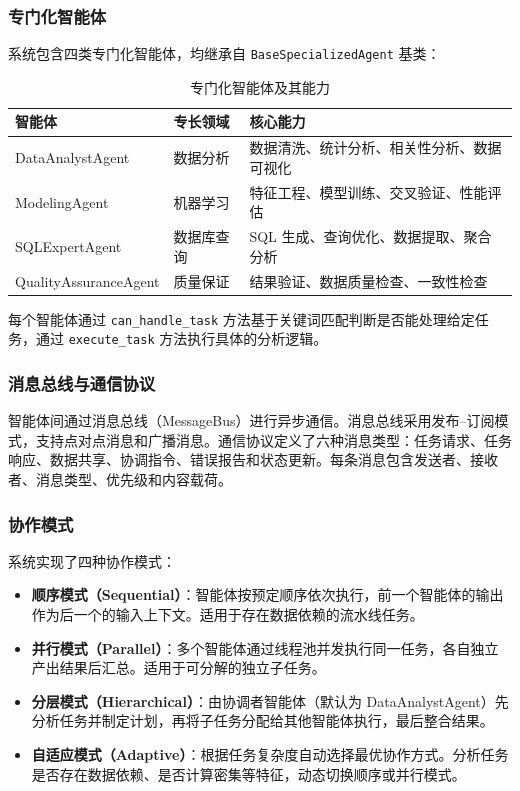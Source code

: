 \subsubsection{专门化智能体}

系统包含四类专门化智能体，均继承自 \texttt{BaseSpecializedAgent} 基类：

\begin{table}[htbp]
    \centering
    \caption{专门化智能体及其能力}
    \label{tab:agents}
    \begin{tabular}{llp{7cm}}
        \toprule
        智能体 & 专长领域 & 核心能力 \\
        \midrule
        DataAnalystAgent & 数据分析 & 数据清洗、统计分析、相关性分析、数据可视化 \\
        ModelingAgent & 机器学习 & 特征工程、模型训练、交叉验证、性能评估 \\
        SQLExpertAgent & 数据库查询 & SQL 生成、查询优化、数据提取、聚合分析 \\
        QualityAssuranceAgent & 质量保证 & 结果验证、数据质量检查、一致性检查 \\
        \bottomrule
    \end{tabular}
\end{table}

每个智能体通过 \texttt{can\_handle\_task} 方法基于关键词匹配判断是否能处理给定任务，通过 \texttt{execute\_task} 方法执行具体的分析逻辑。

\subsubsection{消息总线与通信协议}

智能体间通过消息总线（MessageBus）进行异步通信。消息总线采用发布--订阅模式，支持点对点消息和广播消息。通信协议定义了六种消息类型：任务请求、任务响应、数据共享、协调指令、错误报告和状态更新。每条消息包含发送者、接收者、消息类型、优先级和内容载荷。

\subsubsection{协作模式}

系统实现了四种协作模式：

\begin{itemize}
    \item \textbf{顺序模式（Sequential）}：智能体按预定顺序依次执行，前一个智能体的输出作为后一个的输入上下文。适用于存在数据依赖的流水线任务。
    \item \textbf{并行模式（Parallel）}：多个智能体通过线程池并发执行同一任务，各自独立产出结果后汇总。适用于可分解的独立子任务。
    \item \textbf{分层模式（Hierarchical）}：由协调者智能体（默认为 DataAnalystAgent）先分析任务并制定计划，再将子任务分配给其他智能体执行，最后整合结果。
    \item \textbf{自适应模式（Adaptive）}：根据任务复杂度自动选择最优协作方式。分析任务是否存在数据依赖、是否计算密集等特征，动态切换顺序或并行模式。
\end{itemize}

